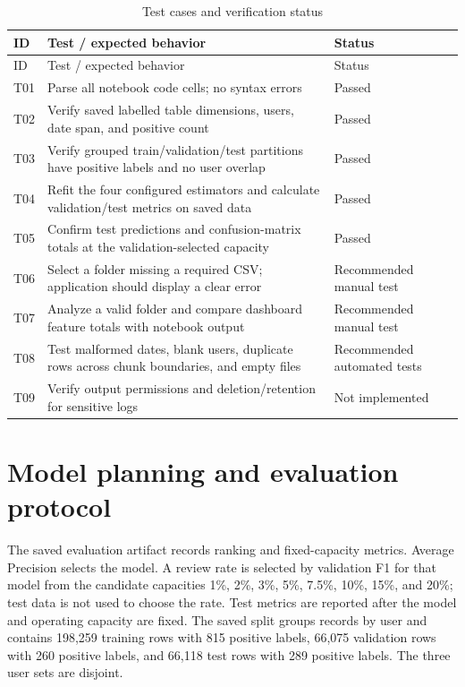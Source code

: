 \documentclass[12pt,a4paper,oneside]{report}
\begin{document}
\begin{longtable}{|p{}|p{}|p{}|}
\caption{Test cases and verification status}
\label{tab:tests}\\
\hline
ID & Test / expected behavior & Status\\
\hline
\endfirsthead
\hline
ID & Test / expected behavior & Status\\
\hline
\endhead
T01 & Parse all notebook code cells; no syntax errors & Passed\\
\hline
T02 & Verify saved labelled table dimensions, users, date span, and positive count & Passed\\
\hline
T03 & Verify grouped train/validation/test partitions have positive labels and no user overlap & Passed\\
\hline
T04 & Refit the four configured estimators and calculate validation/test metrics on saved data & Passed\\
\hline
T05 & Confirm test predictions and confusion-matrix totals at the validation-selected capacity & Passed\\
\hline
T06 & Select a folder missing a required CSV; application should display a clear error & Recommended manual test\\
\hline
T07 & Analyze a valid folder and compare dashboard feature totals with notebook output & Recommended manual test\\
\hline
T08 & Test malformed dates, blank users, duplicate rows across chunk boundaries, and empty files & Recommended automated tests\\
\hline
T09 & Verify output permissions and deletion/retention for sensitive logs & Not implemented\\
\hline
\end{longtable}

\section{Model planning and evaluation protocol}
The saved evaluation artifact records ranking and fixed-capacity
metrics. Average Precision selects the model. A review rate is selected
by validation F1 for that model from the candidate capacities 1\%, 2\%,
3\%, 5\%, 7.5\%, 10\%, 15\%, and 20\%; test data is not used to choose
the rate. Test metrics are reported after the model and operating
capacity are fixed. The saved split groups records by user and contains
198,259 training
rows with 815 positive labels, 66,075 validation rows with 260 positive
labels, and 66,118 test rows with 289 positive labels. The three user
sets are disjoint.
\end{document}

